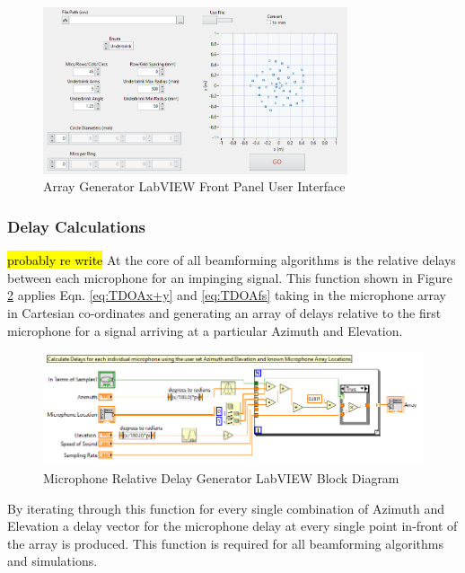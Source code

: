 \documentclass{UoNMCHA}
\numberwithin{equation}{section}
\begin{document}
    \begin{figure}[H]
        \centering
        \includegraphics[keepaspectratio, width = 0.8\textwidth]{Figures/ArrayGenPanel.png}
        \caption{Array Generator LabVIEW Front Panel User Interface}
        \label{fig:ArrayGenPanel}
    \end{figure}
    
\subsubsection{Delay Calculations} \label{sec:Delay Calculations}
    \hl{probably re write}
    At the core of all beamforming algorithms is the relative delays between each microphone for an impinging signal. This function shown in Figure \ref{fig:MicDelayBlock} applies Eqn. \ref{eq:TDOAx+y} and \ref{eq:TDOAfs} taking in the microphone array in Cartesian co-ordinates and generating an array of delays relative to the first microphone for a signal arriving at a particular Azimuth and Elevation.
    
    \begin{figure}[H]
        \centering
        \includegraphics[keepaspectratio, width = \textwidth]{Figures/DelayCalcBlock.png}
        \caption{Microphone Relative Delay Generator LabVIEW Block Diagram}
        \label{fig:MicDelayBlock}
    \end{figure}    
    
    By iterating through this function for every single combination of Azimuth and Elevation a delay vector for the microphone delay at every single point in-front of the array is produced. This function is required for all beamforming algorithms and simulations.
    
\end{document}

